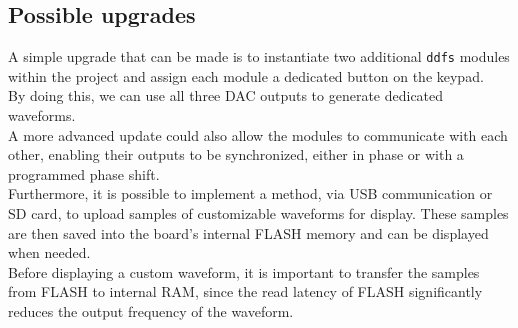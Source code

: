 \subsection{Possible upgrades}
A simple upgrade that can be made is to instantiate two additional \texttt{ddfs} modules within the project and assign each module a dedicated button on the keypad. \\
By doing this, we can use all three DAC outputs to generate dedicated waveforms. \\
A more advanced update could also allow the modules to communicate with each other, enabling their outputs to be synchronized, either in phase or with a programmed phase shift. \\
Furthermore, it is possible to implement a method, via USB communication or SD card, to upload samples of customizable waveforms for display. These samples are then saved into the board's internal FLASH memory and can be displayed when needed. \\
Before displaying a custom waveform, it is important to transfer the samples from FLASH to internal RAM, since the read latency of FLASH significantly reduces the output frequency of the waveform.